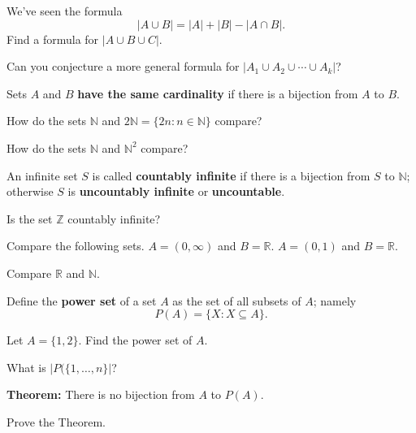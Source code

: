\documentclass[12pt,letterpaper]{article}
\begin{document}
\begin{enumerate}

\Problem 
We've seen the formula
\begin{equation*}
	|A\cup B| = |A| + |B| - |A\cap B|.
\end{equation*}
Find a formula for $|A\cup B\cup C|$.  

\vfill

\Problem Can you conjecture a more
general formula for $|A_1 \cup A_2 \cup \cdots \cup A_k|$?
\vfill

\newpage

\begin{defn}
Sets $A$ and $B$ {\bf have the same cardinality} if there is a bijection from $A$ to $B$.
\end{defn}

\Problem How do the sets $\mathbb{N}$ and $2\mathbb{N}=\{2n: n\in \mathbb{N} \}$ compare?

\vfill

\Problem How do the sets $\mathbb{N}$ and $\mathbb{N}^2$ compare?

\vfill

\begin{defn}
An infinite set $S$ is called {\bf countably infinite} if there is a bijection from $S$ to $\mathbb{N}$; otherwise $S$ is {\bf uncountably infinite} or {\bf uncountable}.
\end{defn}

\newpage

\Problem Is the set $\mathbb{Z}$ countably infinite?

\vfill

\Problem Compare the following sets.
\Part $A=(0,\infty)$ and $B=\mathbb{R}$.
\vfill
\Part $A=(0,1)$ and $B=\mathbb{R}$.
\vfill

\newpage

\Problem Compare $\mathbb{R}$ and $\mathbb{N}$.

\newpage

\begin{defn}
Define the {\bf power set} of a set $A$ as the set of all subsets of $A$; namely
$$P(A)=\{ X : X \subseteq A\}.$$
\end{defn}

\Problem Let $A=\{1,2\}$. Find the power set of $A$.

\vfill

\Problem What is $|P(\{1, \dots, n\}|$?

\vfill
\vfill
\vfill
\vfill

\newpage

{\bf Theorem:} There is no bijection from $A$ to $P(A)$.

\Problem Prove the Theorem.


\end{enumerate}
\end{document}
